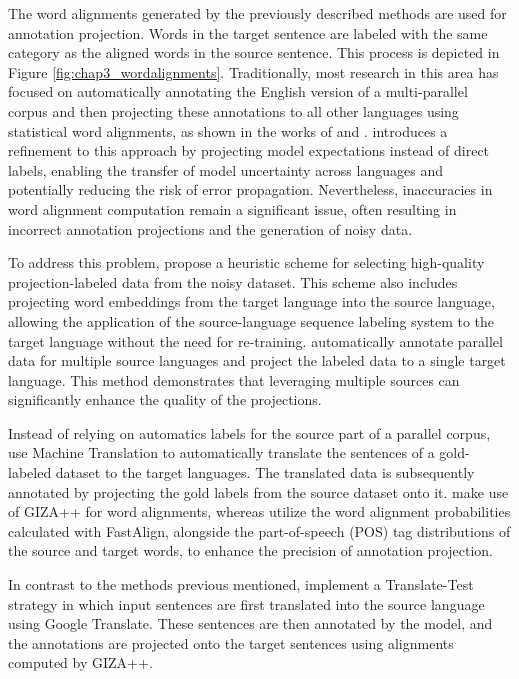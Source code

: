 The word alignments generated by the previously described methods are used for annotation projection. Words in the target sentence are labeled with the same category as the aligned words in the source sentence. This process is depicted in Figure \ref{fig:chap3_wordalignments}. 
Traditionally, most research in this area has focused on automatically annotating the English version of a multi-parallel corpus and then projecting these annotations to all other languages using statistical word alignments, as shown in the works of  \citet{yarowsky-etal-2001-inducing,hwa2005bootstrapping,Ehrmann} and \cite{fu-etal-2011-generating}. \citet{wang-manning-2014-cross} introduces a refinement to this approach by projecting model expectations instead of direct labels, enabling the transfer of model uncertainty across languages and potentially reducing the risk of error propagation. Nevertheless, inaccuracies in word alignment computation remain a significant issue, often resulting in incorrect annotation projections and the generation of noisy data.

To address this problem, \citet{ni-etal-2017-weakly} propose a heuristic scheme for selecting high-quality projection-labeled data from the noisy dataset. This scheme also includes projecting word embeddings from the target language into the source language, allowing the application of the source-language sequence labeling system to the target language without the need for re-training.  \citet{agerri-etal-2018-building} automatically annotate parallel data for multiple source languages and project the labeled data to a single target language. This method demonstrates that leveraging multiple sources can significantly enhance the quality of the projections. 

Instead of relying on automatics labels for the source part of a parallel corpus, \citet{tiedemann-etal-2014-treebank,fei-etal-2020-cross} use Machine Translation to automatically translate the sentences of a gold-labeled dataset to the target languages. The translated data is subsequently annotated by projecting the gold labels from the source dataset onto it. \citet{tiedemann-etal-2014-treebank} make use of GIZA++ for word alignments, whereas \citet{fei-etal-2020-cross} utilize the word alignment probabilities calculated with FastAlign, alongside the part-of-speech (POS) tag distributions of the source and target words, to enhance the precision of annotation projection.

In contrast to the methods previous mentioned,  \cite{shah2010synergy} implement a Translate-Test strategy in which input sentences are first translated into the source language using Google Translate. These sentences are then annotated by the model, and the annotations are projected onto the target sentences using alignments computed by GIZA++.


